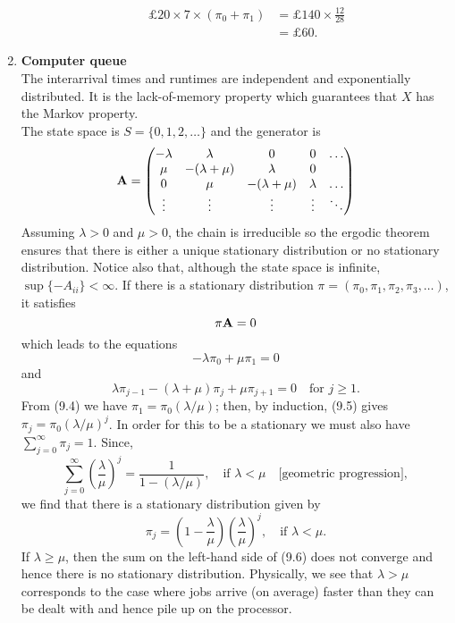 \documentclass[11pt,a4paper]{article}
\begin{document}
\begin{enumerate}
\begin{enumerate}
      \begin{align*}
        \pounds 20 \times 7 \times (\pi_0 + \pi_1) 
        &= \pounds 140 \times \frac{12}{28}\\
        &= \pounds 60.
      \end{align*}
    \end{enumerate}
    \item \textbf{Computer queue}\\
    The interarrival times and runtimes are independent and exponentially distributed. It is the lack-of-memory property which guarantees that $X$ has the Markov property.\\
    The state space is $S = \{0, 1, 2,\ldots\}$ and the generator is 
    $$
    \vb{A} =
    \begin{pmatrix}
      -\lambda & \lambda & 0 & 0 & \ldots\\
      \mu & -(\lambda + \mu) & \lambda & 0\\
      0 & \mu & -(\lambda + \mu) & \lambda & \ldots\\
      \vdots & \vdots & \vdots & \vdots & \ddots
    \end{pmatrix}
    $$
    Assuming $\lambda > 0$ and $\mu > 0$, the chain is irreducible so the ergodic theorem ensures that there is either a unique stationary distribution or no stationary distribution. Notice also that, although the state space is infinite, $\sup\{-A_{ii}\} < \infty$. If there is a stationary distribution $\pi = (\pi_0, \pi_1, \pi_2, \pi_3, \ldots)$, it satisfies 
    $$
    \pi\vb{A} = 0
    $$
    which leads to the equations
    \begin{equation}\tag{9.4}
      -\lambda\pi_0 + \mu\pi_1 = 0
    \end{equation}
    and
    \begin{equation}\tag{9.5}
      \lambda\pi_{j - 1} - (\lambda + \mu)\pi_j + \mu\pi_{j + 1} = 0\quad\text{for $j \geq 1$}.
    \end{equation}
    From (9.4) we have $\pi_1 = \pi_0(\lambda/\mu)$; then, by induction, (9.5) gives $\pi_j = \pi_0(\lambda/\mu)^j$. In order for this to be a stationary we must also have $\sum_{j = 0}^\infty\pi_j = 1$. Since,
    \begin{equation}\tag{9.6}
      \sum_{j = 0}^\infty\left(\frac{\lambda}{\mu}\right)^j = \frac{1}{1 - (\lambda/\mu)},\quad \text{if $\lambda < \mu$}\quad \text{[geometric progression]},
    \end{equation}
    we find that there is a stationary distribution given by
    $$
    \pi_j = \left(1 - \frac{\lambda}{\mu}\right)\left(\frac{\lambda}{\mu}\right)^j,\quad\text{if $\lambda < \mu$}.
    $$
    If $\lambda \geq \mu$, then the sum on the left-hand side of (9.6) does not converge and hence there is no stationary distribution. Physically, we see that $\lambda > \mu$ corresponds to the case where jobs arrive (on average) faster than they can be dealt with and hence pile up on the processor.
  \end{enumerate}
\end{document}
